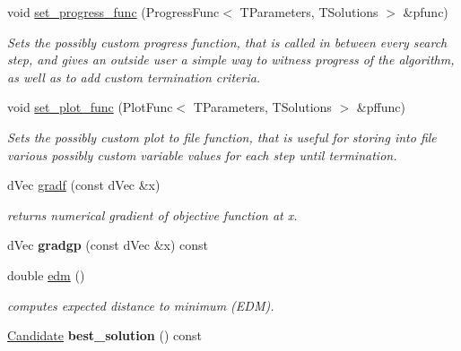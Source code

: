 \begin{DoxyCompactItemize}
\item 
void \hyperlink{classlibcmaes_1_1ESOStrategy_a9d44ba79106b6afbd5881c4f33800840}{set\-\_\-progress\-\_\-func} (Progress\-Func$<$ T\-Parameters, T\-Solutions $>$ \&pfunc)
\begin{DoxyCompactList}\small\item\em Sets the possibly custom progress function, that is called in between every search step, and gives an outside user a simple way to witness progress of the algorithm, as well as to add custom termination criteria. \end{DoxyCompactList}\item 
void \hyperlink{classlibcmaes_1_1ESOStrategy_ac0cdfca8b5614843661af4153e8c6b51}{set\-\_\-plot\-\_\-func} (Plot\-Func$<$ T\-Parameters, T\-Solutions $>$ \&pffunc)
\begin{DoxyCompactList}\small\item\em Sets the possibly custom plot to file function, that is useful for storing into file various possibly custom variable values for each step until termination. \end{DoxyCompactList}\item 
d\-Vec \hyperlink{classlibcmaes_1_1ESOStrategy_a43bd0b30c43445bc4ee2257963eebf47}{gradf} (const d\-Vec \&x)
\begin{DoxyCompactList}\small\item\em returns numerical gradient of objective function at x. \end{DoxyCompactList}\item 
\hypertarget{classlibcmaes_1_1ESOStrategy_a8a0581ead7ca7fac1f414c92ed030317}{d\-Vec {\bfseries gradgp} (const d\-Vec \&x) const }\label{classlibcmaes_1_1ESOStrategy_a8a0581ead7ca7fac1f414c92ed030317}

\item 
double \hyperlink{classlibcmaes_1_1ESOStrategy_a6350c635353e7b54e78abb223a5d4029}{edm} ()
\begin{DoxyCompactList}\small\item\em computes expected distance to minimum (E\-D\-M). \end{DoxyCompactList}\item 
\hypertarget{classlibcmaes_1_1ESOStrategy_a81441905608aba3daa6d60a78eb47763}{\hyperlink{classlibcmaes_1_1Candidate}{Candidate} {\bfseries best\-\_\-solution} () const }\label{classlibcmaes_1_1ESOStrategy_a81441905608aba3daa6d60a78eb47763}

\end{DoxyCompactItemize}
